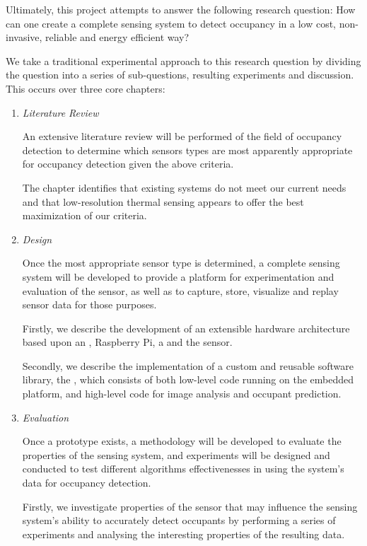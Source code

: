 \documentclass[../thesis/thesis.tex]{subfiles}
\begin{document}
Ultimately, this project attempts to answer the following research question: How can one create a complete sensing system to detect occupancy in a low cost, non-invasive, reliable and energy efficient way?

We take a traditional experimental approach to this research question by dividing the question into a series of sub-questions, resulting experiments and discussion. This occurs over three core chapters:

\begin{enumerate}
\item \emph{Literature Review}

An extensive literature review will be performed of the field of occupancy detection to determine which sensors types are most apparently appropriate for occupancy detection given the above criteria. 

The chapter identifies that existing systems do not meet our current needs and that low-resolution thermal sensing appears to offer the best maximization of our criteria.

\item \emph{Design}

Once the most appropriate sensor type is determined, a complete sensing system will be developed to provide a platform for experimentation and evaluation of the sensor, as well as to capture, store, visualize and replay sensor data for those purposes.

Firstly, we describe the development of an extensible hardware architecture based upon an \ard, Raspberry Pi, a \pir and the \mlx sensor.

Secondly, we describe the implementation of a custom and reusable software library, the \tarl, which consists of both low-level code running on the \ard embedded platform, and high-level code for image analysis and occupant prediction.

\item \emph{Evaluation}

Once a prototype exists, a methodology will be developed to evaluate the properties of the sensing system, and experiments will be designed and conducted to test different algorithms effectivenesses in using the system's data for occupancy detection.

Firstly, we investigate properties of the sensor that may influence the sensing system's ability to accurately detect occupants by performing a series of experiments and analysing the interesting properties of the resulting data.


\end{enumerate}
\end{document}
